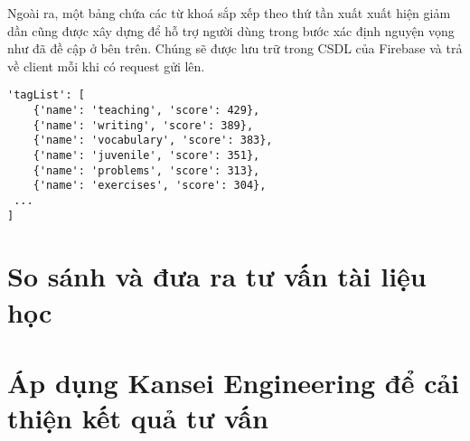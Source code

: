 Ngoài ra, một bảng chứa các từ khoá sắp xếp theo thứ tần xuất xuất hiện giảm dần cũng được xây dựng để hỗ trợ người dùng trong bước xác định nguyện vọng như đã đề cập ở bên trên. Chúng sẽ được lưu trữ trong CSDL của Firebase và trả về client mỗi khi có request gửi lên.

\begin{lstlisting}[style=pythoncode, breaklines = true]
'tagList': [
	{'name': 'teaching', 'score': 429},
	{'name': 'writing', 'score': 389},
	{'name': 'vocabulary', 'score': 383},
	{'name': 'juvenile', 'score': 351},
	{'name': 'problems', 'score': 313},
	{'name': 'exercises', 'score': 304},
 ...
]
\end{lstlisting}

\section{So sánh và đưa ra tư vấn tài liệu học }



\section{Áp dụng Kansei Engineering để cải thiện kết quả tư vấn}